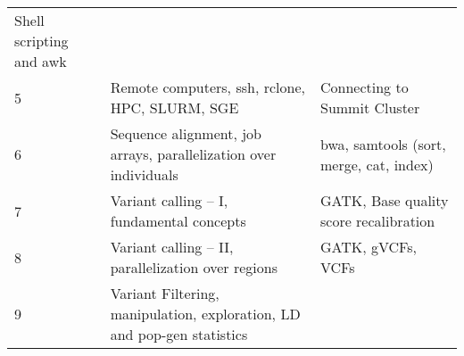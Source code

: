 \documentclass[]{book}
\begin{document}
\begin{longtable}[]{@{}lll@{}}
\begin{minipage}[t]{0.33\columnwidth}
Shell scripting and awk\strut
\end{minipage}\tabularnewline
\begin{minipage}[t]{0.13\columnwidth}\raggedright
5\strut
\end{minipage} & \begin{minipage}[t]{0.46\columnwidth}\raggedright
Remote computers, ssh, rclone, HPC, SLURM, SGE\strut
\end{minipage} & \begin{minipage}[t]{0.33\columnwidth}\raggedright
Connecting to Summit Cluster\strut
\end{minipage}\tabularnewline
\begin{minipage}[t]{0.13\columnwidth}\raggedright
6\strut
\end{minipage} & \begin{minipage}[t]{0.46\columnwidth}\raggedright
Sequence alignment, job arrays, parallelization over individuals\strut
\end{minipage} & \begin{minipage}[t]{0.33\columnwidth}\raggedright
bwa, samtools (sort, merge, cat, index)\strut
\end{minipage}\tabularnewline
\begin{minipage}[t]{0.13\columnwidth}\raggedright
7\strut
\end{minipage} & \begin{minipage}[t]{0.46\columnwidth}\raggedright
Variant calling -- I, fundamental concepts\strut
\end{minipage} & \begin{minipage}[t]{0.33\columnwidth}\raggedright
GATK, Base quality score recalibration\strut
\end{minipage}\tabularnewline
\begin{minipage}[t]{0.13\columnwidth}\raggedright
8\strut
\end{minipage} & \begin{minipage}[t]{0.46\columnwidth}\raggedright
Variant calling -- II, parallelization over regions\strut
\end{minipage} & \begin{minipage}[t]{0.33\columnwidth}\raggedright
GATK, gVCFs, VCFs\strut
\end{minipage}\tabularnewline
\begin{minipage}[t]{0.13\columnwidth}\raggedright
9\strut
\end{minipage} & \begin{minipage}[t]{0.46\columnwidth}\raggedright
Variant Filtering, manipulation, exploration, LD and pop-gen statistics\strut

\end{minipage}
\end{longtable}
\end{document}
